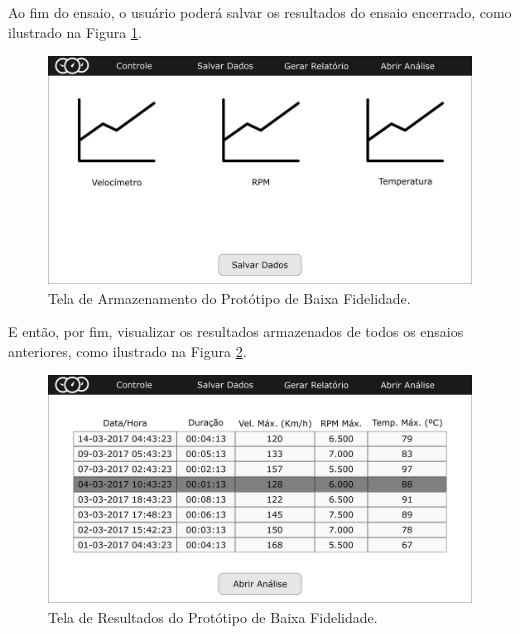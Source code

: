 \begin{anexosenv}
Ao fim do ensaio, o usuário poderá salvar os resultados do ensaio encerrado, como ilustrado na Figura \ref{fig:telasalvardados}.

\begin{figure}[H!]
	\centering
	\includegraphics[keepaspectratio=true,scale= 0.23]{figuras/telasalvardados.png}
	\caption{Tela de Armazenamento do Protótipo de Baixa Fidelidade.}
	\label{fig:telasalvardados}
\end{figure}

E então, por fim, visualizar os resultados armazenados de todos os ensaios anteriores, como ilustrado na Figura \ref{fig:telaresultados}.

\begin{figure}[H!]
	\centering
	\includegraphics[keepaspectratio=true,scale= 0.23]{figuras/telaresultados.png}
	\caption{Tela de Resultados do Protótipo de Baixa Fidelidade.}
	\label{fig:telaresultados}
\end{figure}

\end{anexosenv}



